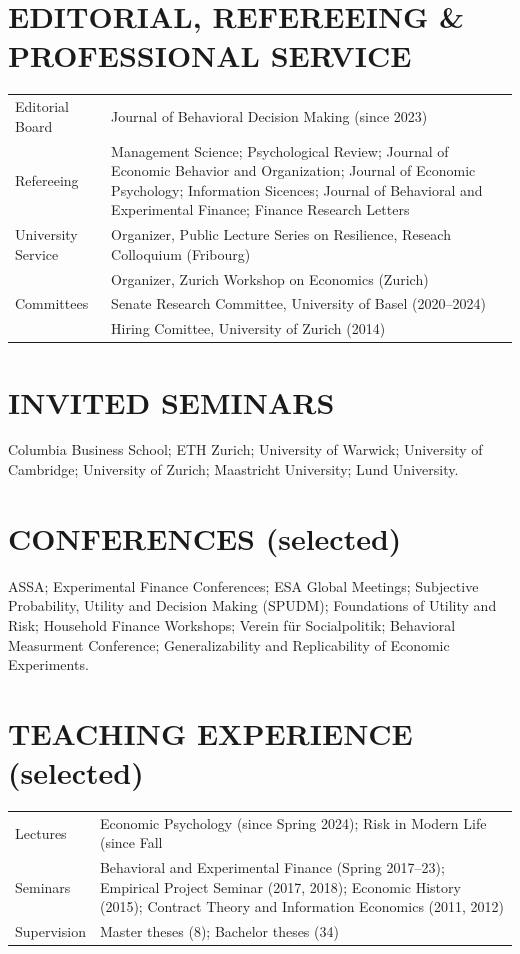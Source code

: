 \documentclass[10pt]{article}
\begin{document}
\section*{EDITORIAL, REFEREEING \& PROFESSIONAL SERVICE}
\begin{tabular}{@{}p{3cm}p{11.5cm}@{}}
Editorial Board & Journal of Behavioral Decision Making (since 2023) \\[3pt]
Refereeing & Management Science; Psychological Review; Journal of Economic Behavior and
Organization; Journal of Economic Psychology; Information Sicences; %
Journal of Behavioral and Experimental Finance; Finance Research Letters \\[3pt]
University Service & Organizer, Public Lecture Series on Resilience, Reseach Colloquium (Fribourg) \\ %
 & Organizer, Zurich Workshop on Economics (Zurich) \\[3pt]
Committees & Senate Research Committee, University of Basel (2020--2024) \\
 & Hiring Comittee, University of Zurich (2014) \\ %
\end{tabular}

\section*{INVITED SEMINARS}
Columbia Business School; ETH Zurich; University of Warwick; University of Cambridge; University of Zurich;
Maastricht University; Lund University.

\section*{CONFERENCES (selected)}
ASSA; Experimental Finance Conferences; ESA Global Meetings; Subjective Probability, Utility and Decision
Making (SPUDM); Foundations of Utility and Risk; Household Finance Workshops; Verein f\"{u}r Socialpolitik;
Behavioral Measurment Conference; %
Generalizability and Replicability of Economic Experiments.

\section*{TEACHING EXPERIENCE (selected)}
\begin{tabular}{@{}p{3cm}p{11.5cm}@{}}
Lectures & Economic Psychology (since Spring 2024); Risk in Modern Life (since Fall %
\\[3pt]
Seminars & Behavioral and Experimental Finance (Spring 2017--23); Empirical Project Seminar (2017, 2018); Economic History (2015); Contract Theory and Information
Economics (2011, 2012) \\[3pt]
Supervision & Master theses (8); Bachelor theses (34) \\
\end{tabular}
\end{document}
